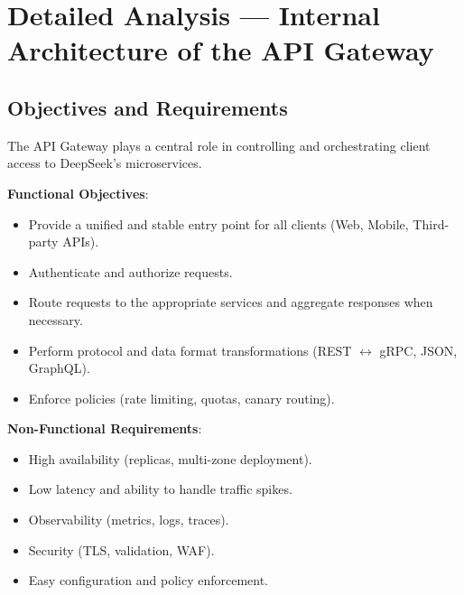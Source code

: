 \documentclass[a4paper,11pt]{article}
\begin{document}
\section{Detailed Analysis — Internal Architecture of the API Gateway}

\subsection{Objectives and Requirements}
The API Gateway plays a central role in controlling and orchestrating client access to DeepSeek's microservices.  

\textbf{Functional Objectives}:
\begin{itemize}
  \item Provide a unified and stable entry point for all clients (Web, Mobile, Third-party APIs).
  \item Authenticate and authorize requests.
  \item Route requests to the appropriate services and aggregate responses when necessary.
  \item Perform protocol and data format transformations (REST $\leftrightarrow$ gRPC, JSON, GraphQL).
  \item Enforce policies (rate limiting, quotas, canary routing).
\end{itemize}

\textbf{Non-Functional Requirements}:
\begin{itemize}
  \item High availability (replicas, multi-zone deployment).
  \item Low latency and ability to handle traffic spikes.
  \item Observability (metrics, logs, traces).
  \item Security (TLS, validation, WAF).
  \item Easy configuration and policy enforcement.
\end{itemize}
\end{document}
